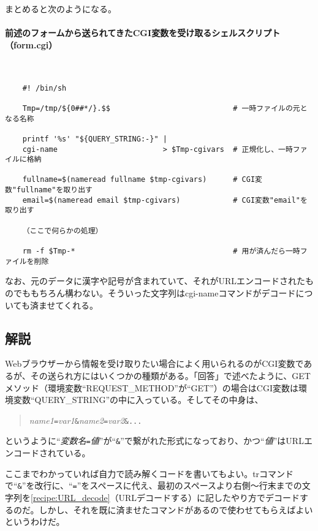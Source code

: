 まとめると次のようになる。
\paragraph{前述のフォームから送られてきたCGI変数を受け取るシェルスクリプト（form.cgi）} 　\\
\begin{frameboxit}{160.0mm}
\begin{verbatim}
	#! /bin/sh
	
	Tmp=/tmp/${0##*/}.$$                            # 一時ファイルの元となる名称
	
	printf '%s' "${QUERY_STRING:-}" |
	cgi-name                        > $Tmp-cgivars  # 正規化し、一時ファイルに格納
	
	fullname=$(nameread fullname $tmp-cgivars)      # CGI変数"fullname"を取り出す
	email=$(nameread email $tmp-cgivars)            # CGI変数"email"を取り出す
	
	（ここで何らかの処理）
	
	rm -f $Tmp-*                                    # 用が済んだら一時ファイルを削除
\end{verbatim}
\end{frameboxit}

なお、元のデータに漢字や記号が含まれていて、それがURLエンコードされたものでももちろん構わない。そういった文字列はcgi-nameコマンドがデコードについても済ませてくれる。

\subsection*{解説}
Webブラウザーから情報を受け取りたい場合によく用いられるのがCGI変数であるが、その送られ方にはいくつかの種類がある。「回答」で述べたように、GETメソッド（環境変数``REQUEST\_{}METHOD''が``GET''）の場合はCGI変数は環境変数``QUERY\_{}STRING''の中に入っている。そしてその中身は、
\begin{quote}
	\textit{name1}\verb|=|\textit{var1}\verb|&|\textit{name2}\verb|=|\textit{var2}\verb|&...|
\end{quote}
というように``\textit{変数名}\verb|=|\textit{値}''が``\verb|&|''で繋がれた形式になっており、かつ``\textit{値}''はURLエンコードされている。

ここまでわかっていれば自力で読み解くコードを書いてもよい。trコマンドで``\verb|&|''を改行に、``\verb|=|''をスペースに代え、最初のスペースより右側～行末までの文字列を\ref{recipe:URL_decode}（URLデコードする）に記したやり方でデコードするのだ。しかし、それを既に済ませたコマンドがあるので使わせてもらえばよいというわけだ。

